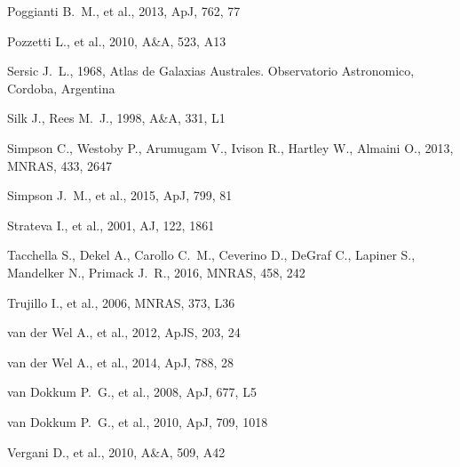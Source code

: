 \documentclass[a4paper,fleqn,usenatbib,useAMS]{mnras}
\begin{document}
\begin{thebibliography}{}
 Poggianti B.~M., et al., 2013, ApJ, 762, 
77 



 Pozzetti L., et al., 2010, A\&A, 523, A13 


  Sersic J.~L., 1968, Atlas de Galaxias Australes. Observatorio
  Astronomico, Cordoba, Argentina


 Silk J., Rees M.~J., 1998, A\&A, 331, L1 


 Simpson C., Westoby P., Arumugam V., 
Ivison R., Hartley W., Almaini O., 2013, MNRAS, 433, 2647 


 Simpson J.~M., et al., 2015, ApJ, 799, 81 



 Strateva I., et al., 2001, AJ, 122, 1861 



 Tacchella S., Dekel A., Carollo
  C.~M., Ceverino D., DeGraf C., Lapiner S., Mandelker N., Primack
  J.~R., 2016, MNRAS, 458, 242



 Trujillo I., et al., 2006, MNRAS, 373, L36 


 van der Wel A., et al., 2012, ApJS, 203, 
24 


 van der Wel A., et al., 2014, ApJ, 788, 28 


 van Dokkum P.~G., et al., 2008, ApJ, 677, 
L5 


 van Dokkum P.~G., et al., 2010,
  ApJ, 709, 1018


 Vergani D., et al., 2010, A\&A, 509, A42 



\end{thebibliography}
\end{document}
